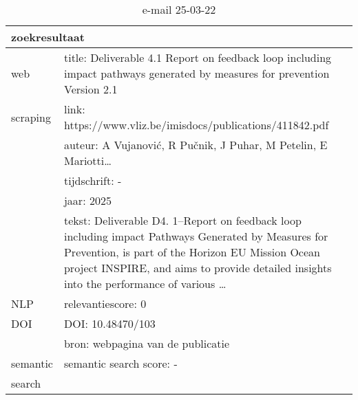 \begin{table}[h!]
    \caption{e-mail 25-03-22}
    \centering
    \begin{tabularx}{\textwidth}{|p{4cm}|X|} 
        \hline
        \multicolumn{2}{|X|}{\textbf{zoekresultaat}} \\
        \hline
        web &title: Deliverable 4.1 Report on feedback loop including impact pathways generated by measures for prevention Version 2.1\\
        scraping&link: https://www.vliz.be/imisdocs/publications/411842.pdf\\
        &auteur: A Vujanović, R Pučnik, J Puhar, M Petelin, E Mariotti…\\
        &tijdschrift: -\\
        &jaar: 2025\\
        &tekst: Deliverable D4. 1–Report on feedback loop including impact Pathways Generated by Measures for Prevention, is part of the Horizon EU Mission Ocean project INSPIRE, and aims to provide detailed insights into the performance of various …\\
        \hline
        NLP&relevantiescore: 0\\
        \hline
        DOI&DOI: 10.48470/103\\
        &bron: webpagina van de publicatie\\
        \hline
        semantic&semantic search score: -\\
        search&\\
        \hline
    \end{tabularx}
    \label{table:email20250322}
\end{table}
